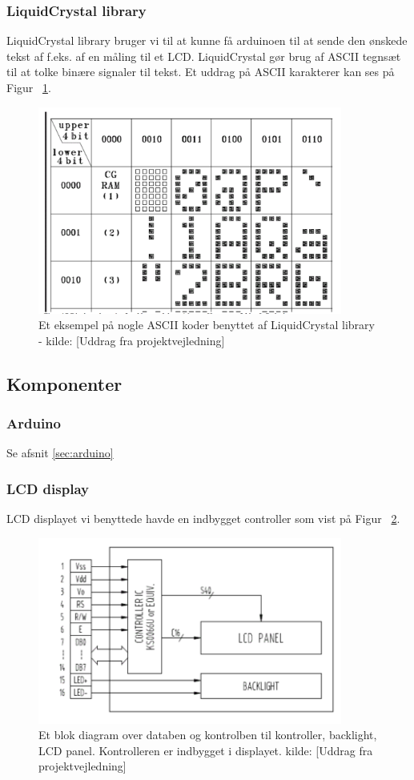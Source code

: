 \subsubsection{LiquidCrystal library}
LiquidCrystal library bruger vi til at kunne få arduinoen til at sende den ønskede tekst af f.eks. af en måling til et LCD. LiquidCrystal gør brug af ASCII tegnsæt til at tolke binære signaler til tekst. Et uddrag på ASCII karakterer kan ses på Figur ~\ref{ASCII}. 
\begin{figure}[H]
	\centering
    \includegraphics[width=10cm]{figures/LCDdesign/ASCII.png}
	\caption{Et eksempel på nogle ASCII koder benyttet af LiquidCrystal library - kilde: [Uddrag fra projektvejledning]}
	\label{ASCII}
\end{figure}

\subsection{Komponenter}
\subsubsection{Arduino}
Se afsnit \ref{sec:arduino} 

\subsubsection{LCD display}
LCD displayet vi benyttede havde en indbygget controller som vist på Figur ~\ref{driver}.
\begin{figure}[H]
	\centering
    \includegraphics[width=10cm]{figures/LCDdesign/displayblokdiagram.png}
	\caption{Et blok diagram over databen og kontrolben til  kontroller, backlight, LCD panel. Kontrolleren er indbygget i displayet. kilde: [Uddrag fra projektvejledning]}
	\label{driver}
\end{figure}


